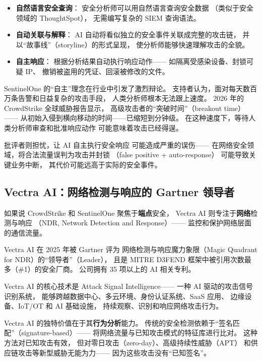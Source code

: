 \begin{itemize}[noitemsep]
  \item \textbf{自然语言安全查询}：
        安全分析师可以用自然语言查询安全数据
        （类似于安全领域的 ThoughtSpot），
        无需编写复杂的 SIEM 查询语法。
  \item \textbf{自动关联与解释}：
        AI 自动将看似独立的安全事件关联成完整的攻击链，
        并以``故事线''（storyline）的形式呈现，
        使分析师能够快速理解攻击的全貌。
  \item \textbf{自主响应}：
        根据分析结果自动执行响应动作——
        如隔离受感染设备、封锁可疑 IP、
        撤销被盗用的凭证、回滚被修改的文件。
\end{itemize}

SentinelOne 的``自主''理念在行业中引发了激烈辩论。
支持者认为，面对每天数百万条告警和日益复杂的攻击手段，
人类分析师根本无法跟上速度。
2026 年的 CrowdStrike 全球威胁报告显示，
高级攻击者的``突破时间''（breakout time）——
从初始入侵到横向移动的时间——已缩短到分钟级。
在这种速度下，等待人类分析师审查和批准响应动作
可能意味着攻击已经得逞。

批评者则担忧，让 AI 自主执行安全响应
可能造成严重的误伤——
在网络安全领域，将合法流量误判为攻击并封锁
（false positive + auto-response）
可能导致关键业务中断，
其代价可能远高于实际的安全事件。

\subsection{Vectra AI：网络检测与响应的 Gartner 领导者}

如果说 CrowdStrike 和 SentinelOne 聚焦于\textbf{端点}安全，
Vectra AI 则专注于\textbf{网络}检测与响应
（NDR, Network Detection and Response）——
监控和保护网络层面的通信流量。

Vectra AI 在 2025 年被 Gartner 评为
网络检测与响应魔力象限（Magic Quadrant for NDR）的``领导者''（Leader），
且是 MITRE D3FEND 框架中被引用次数最多（\#1）的安全厂商。
公司拥有 35 项以上的 AI 相关专利。

Vectra AI 的核心技术是 Attack Signal Intelligence——
一种 AI 驱动的攻击信号识别系统，
能够跨越数据中心、多云环境、身份认证系统、SaaS 应用、
边缘设备、IoT/OT 和 AI 基础设施，
持续观察、识别和响应网络攻击行为。

Vectra AI 的独特价值在于其\textbf{行为分析}能力。
传统的安全检测依赖于``签名匹配''（signature-based）——
将网络流量与已知攻击模式的特征库进行比对。
这种方法对已知攻击有效，
但对零日攻击（zero-day）、高级持续性威胁（APT）
和供应链攻击等新型威胁无能为力——
因为这些攻击没有``已知签名''。

